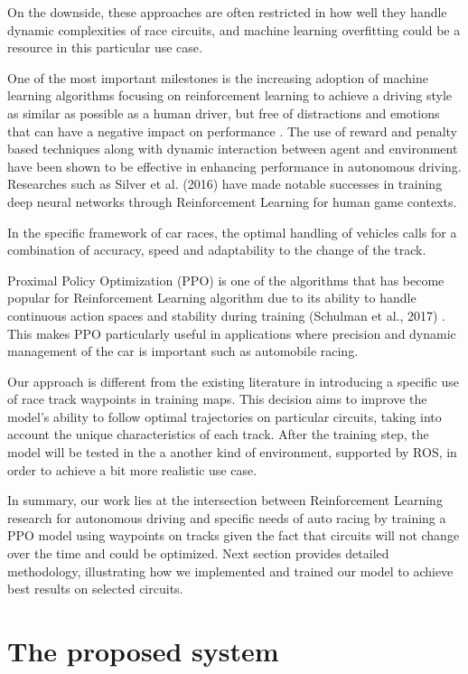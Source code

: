 \documentclass[conference]{IEEEtran}
\begin{document}
On the downside, these approaches are often restricted in how well they handle dynamic complexities of race circuits, and machine learning overfitting could be a resource in this particular use case.

One of the most important milestones is the increasing adoption of machine learning algorithms focusing on reinforcement learning to achieve a driving style as similar as possible as a human driver, but free of distractions and emotions that can have a negative impact on performance \cite{andru}.
%
The use of reward and penalty based techniques along with dynamic interaction between agent and environment have been shown to be effective in enhancing performance in autonomous driving.
%
Researches such as Silver et al. (2016) \cite{GO_DNN} have made notable successes in training deep neural networks through Reinforcement Learning for human game contexts.

In the specific framework of car races, the optimal handling of vehicles calls for a combination of accuracy, speed and adaptability to the change of the track.

Proximal Policy Optimization (PPO) is one of the algorithms that has become popular for Reinforcement Learning algorithm due to its ability to handle continuous action spaces and stability during training (Schulman et al., 2017) \cite{PPOOpenAI}.
%
This makes PPO particularly useful in applications where precision and dynamic management of the car is important such as automobile racing.

Our approach is different from the existing literature in introducing a specific use of race track waypoints in training maps.
%
This decision aims to improve the model's ability to follow optimal trajectories on particular circuits, taking into account the unique characteristics of each track.
%
After the training step, the model will be tested in the a another kind of environment, supported by ROS, in order to achieve a bit more realistic use case.

In summary, our work lies at the intersection between Reinforcement Learning research for autonomous driving and specific needs of auto racing by training a PPO model using  waypoints on tracks given the fact that circuits will not change over the time and could be optimized.
%
Next section provides detailed methodology, illustrating how we implemented and trained our model to achieve best results on selected circuits.

%
%
%
\section{The proposed system}
\end{document}

